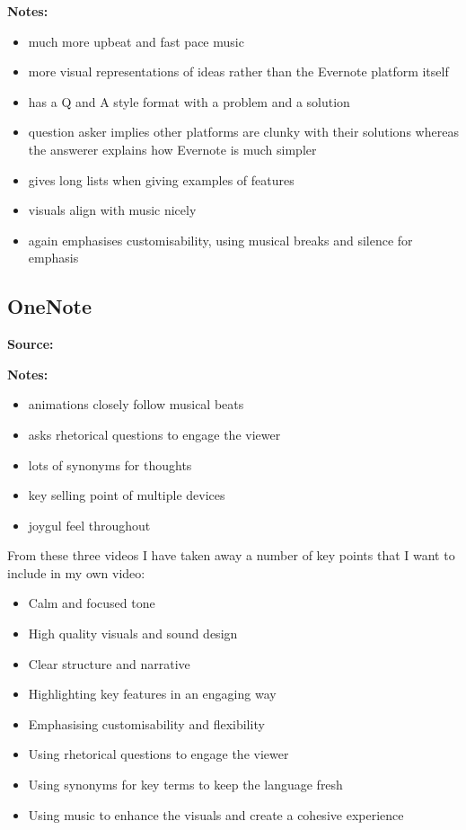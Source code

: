 \textbf{Notes:}

\begin{itemize}
    \item much more upbeat and fast pace music
    \item more visual representations of ideas rather than the Evernote platform itself
    \item has a Q and A style format with a problem and a solution
    \item question asker implies other platforms are clunky with their solutions whereas the answerer explains how Evernote is much simpler
    \item gives long lists when giving examples of features
    \item visuals align with music nicely 
    \item again emphasises customisability, using musical breaks and silence for emphasis
\end{itemize}

\subsection*{OneNote}
\textbf{Source:} \cite{VideoIntroducingOneNote}

\textbf{Notes:}

\begin{itemize}
    \item animations closely follow musical beats
    \item asks rhetorical questions to engage the viewer
    \item lots of synonyms for thoughts
    \item key selling point of multiple devices
    \item joygul feel throughout
\end{itemize}


From these three videos I have taken away a number of key points that I want to include in my own video:
\begin{itemize}
    \item Calm and focused tone
    \item High quality visuals and sound design
    \item Clear structure and narrative
    \item Highlighting key features in an engaging way
    \item Emphasising customisability and flexibility
    \item Using rhetorical questions to engage the viewer
    \item Using synonyms for key terms to keep the language fresh
    \item Using music to enhance the visuals and create a cohesive experience
\end{itemize}